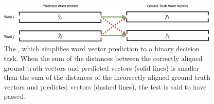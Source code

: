   \begin{figure}[t]
    \centering
    \includegraphics[width=\linewidth]{figures/2vs2}
    \caption{The \tvt, which simplifies word vector prediction to a binary decision task.  
   When the sum of the distances between the correctly aligned ground truth vectors and predicted vectors (solid lines) is smaller than the sum of the distances of the incorrectly aligned ground truth vectors and predicted vectors (dashed lines), the \tvt test is said to have passed.}
    \label{fig:2vs2}
  \end{figure}
